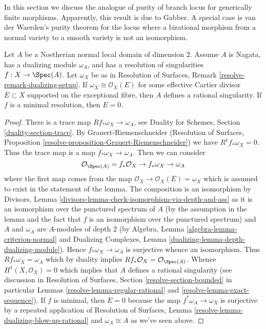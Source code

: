 \noindent
In this section we discuss the analogue of purity of branch locus for
generically finite morphisms. Apparently, this result is due to Gabber.
A special case is van der Waerden's purity theorem for the locus where
a birational morphism from a normal variety to a smooth variety is not
an isomorphism.

\begin{lemma}
\label{lemma-characterize-rational-singularity}
Let $A$ be a Noetherian normal local domain of dimension $2$.
Assume $A$ is Nagata, has a dualizing module $\omega_A$, and has a
resolution of singularities $f : X \to \Spec(A)$.
Let $\omega_X$ be as in Resolution of Surfaces,
Remark \ref{resolve-remark-dualizing-setup}.
If $\omega_X \cong \mathcal{O}_X(E)$ for some effective
Cartier divisor $E \subset X$ supported on the exceptional
fibre, then $A$ defines a rational singularity.
If $f$ is a minimal resolution, then $E = 0$.
\end{lemma}

\begin{proof}
There is a trace map $Rf_*\omega_X \to \omega_A$, see
Duality for Schemes, Section \ref{duality-section-trace}.
By Grauert-Riemenschneider
(Resolution of Surfaces,
Proposition \ref{resolve-proposition-Grauert-Riemenschneider})
we have $R^1f_*\omega_X = 0$.
Thus the trace map is a map $f_*\omega_X \to \omega_A$.
Then we can consider
$$
\mathcal{O}_{\Spec(A)} = f_*\mathcal{O}_X \to f_*\omega_X \to \omega_A
$$
where the first map comes from the map
$\mathcal{O}_X \to \mathcal{O}_X(E) = \omega_X$ which is
assumed to exist in the statement of the lemma.
The composition is an isomorphism by Divisors, Lemma
\ref{divisors-lemma-check-isomorphism-via-depth-and-ass}
as it is an isomorphism over the punctured spectrum of $A$
(by the assumption in the lemma and the fact that $f$ is an isomorphism
over the punctured spectrum) and $A$ and $\omega_A$
are $A$-modules of depth $2$ (by
Algebra, Lemma \ref{algebra-lemma-criterion-normal} and
Dualizing Complexes, Lemma \ref{dualizing-lemma-depth-dualizing-module}).
Hence $f_*\omega_X \to \omega_A$ is surjective whence an isomorphism.
Thus $Rf_*\omega_X = \omega_A$ which by duality implies
$Rf_*\mathcal{O}_X = \mathcal{O}_{\Spec(A)}$.
Whence $H^1(X, \mathcal{O}_X) = 0$ which implies that $A$
defines a rational singularity (see discussion in
Resolution of Surfaces, Section
\ref{resolve-section-bounded} in particular
Lemmas \ref{resolve-lemma-regular-rational} and
\ref{resolve-lemma-exact-sequence}).
If $f$ is minimal, then $E = 0$ because the map
$f^*\omega_A \to \omega_X$ is surjective by
a repeated application of Resolution of Surfaces, Lemma
\ref{resolve-lemma-dualizing-blow-up-rational}
and $\omega_A \cong A$ as we've seen above.
\end{proof}

